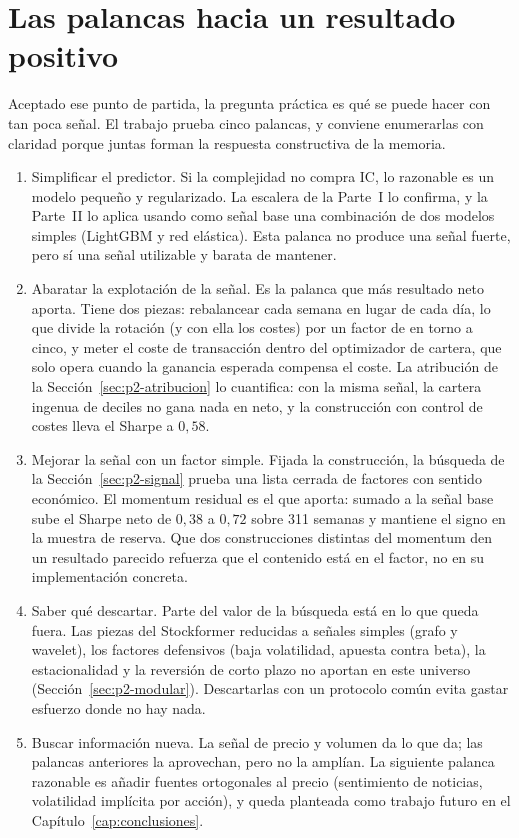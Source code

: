 \section{Las palancas hacia un resultado positivo}\label{sec:d-palancas}

Aceptado ese punto de partida, la pregunta práctica es qué se puede hacer con tan poca
señal. El trabajo prueba cinco palancas, y conviene enumerarlas con claridad porque juntas
forman la respuesta constructiva de la memoria.

\begin{enumerate}
  \item Simplificar el predictor. Si la complejidad no compra IC, lo razonable es un
  modelo pequeño y regularizado. La escalera de la Parte~I lo confirma, y la Parte~II lo
  aplica usando como señal base una combinación de dos modelos simples (LightGBM y red
  elástica). Esta palanca no produce una señal fuerte, pero sí una señal utilizable y
  barata de mantener.
  \item Abaratar la explotación de la señal. Es la palanca que más resultado neto aporta.
  Tiene dos piezas: rebalancear cada semana en lugar de cada día, lo que divide la
  rotación (y con ella los costes) por un factor de en torno a cinco, y meter el coste de
  transacción dentro del optimizador de cartera, que solo opera cuando la ganancia
  esperada compensa el coste. La atribución de la Sección~\ref{sec:p2-atribucion} lo
  cuantifica: con la misma señal, la cartera ingenua de deciles no gana nada en neto, y la
  construcción con control de costes lleva el Sharpe a $0{,}58$.
  \item Mejorar la señal con un factor simple. Fijada la construcción, la búsqueda de la
  Sección~\ref{sec:p2-signal} prueba una lista cerrada de factores con sentido económico.
  El momentum residual es el que aporta: sumado a la señal base sube el Sharpe neto de
  $0{,}38$ a $0{,}72$ sobre 311 semanas y mantiene el signo en la muestra de reserva. Que
  dos construcciones distintas del momentum den un resultado parecido refuerza que el
  contenido está en el factor, no en su implementación concreta.
  \item Saber qué descartar. Parte del valor de la búsqueda está en lo que queda fuera.
  Las piezas del Stockformer reducidas a señales simples (grafo y wavelet), los factores
  defensivos (baja volatilidad, apuesta contra beta), la estacionalidad y la reversión de
  corto plazo no aportan en este universo (Sección~\ref{sec:p2-modular}). Descartarlas con
  un protocolo común evita gastar esfuerzo donde no hay nada.
  \item Buscar información nueva. La señal de precio y volumen da lo que da; las palancas
  anteriores la aprovechan, pero no la amplían. La siguiente palanca razonable es añadir
  fuentes ortogonales al precio (sentimiento de noticias, volatilidad implícita por
  acción), y queda planteada como trabajo futuro en el
  Capítulo~\ref{cap:conclusiones}.
\end{enumerate}

